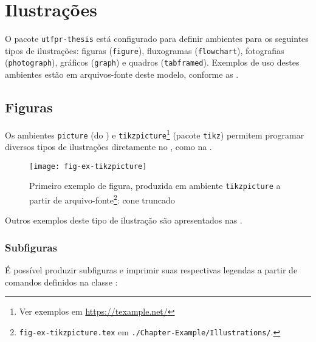 \section{Ilustrações}%
\label{sect:ill}

O pacote \texttt{utfpr-thesis} está configurado para definir ambientes para os seguintes tipos de ilustrações: figuras (\texttt{figure}), fluxogramas (\texttt{flowchart}), fotografias (\texttt{photograph}), gráficos (\texttt{graph}) e quadros (\texttt{tabframed}).
Exemplos de uso destes ambientes estão em arquivos-fonte deste modelo, conforme as .

\subsection{Figuras}%
\label{ssect:fig}

Os ambientes \texttt{picture} (do ) e \texttt{tikzpicture}\footnote{Ver exemplos em \url{https://texample.net/}} (pacote \texttt{tikz}) permitem programar diversos tipos de ilustrações diretamente no , como na .

\begin{figure}[!htbp]
\begin{minipage}{\CaptionWidth}
\caption[%
  Primeiro exemplo de figura, produzida em ambiente \texttt{tikzpicture} a partir de arquivo-fonte: cone truncado%
]{%
  Primeiro exemplo de figura, produzida em ambiente \texttt{tikzpicture} a partir de arquivo-fonte\footnote{\texttt{fig-ex-tikzpicture.tex} em \texttt{./Chapter-Example/Illustrations/}.}: cone truncado%
}%
\label{fig:ex-tikzpicture}
\texttt{[image: fig-ex-tikzpicture]}
\end{minipage}
\end{figure}

Outros exemplos deste tipo de ilustração são apresentados nas .

\subsubsection{Subfiguras}%
\label{sssect:subfig}

É possível produzir subfiguras e imprimir suas respectivas legendas a partir de comandos definidos na classe \texttt{}:

